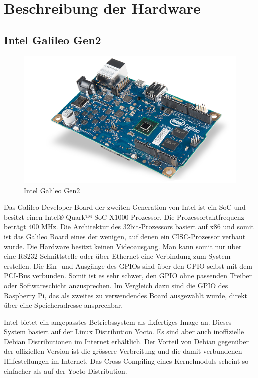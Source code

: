 \pagebreak
\section{Beschreibung der Hardware}
\label{beschreibung_hardware}
\subsection{Intel Galileo Gen2}

\begin{figure}
\centering
\includegraphics[scale=0.5]{images/iot_galileo.png}
\caption{Intel Galileo Gen2\cite{intel_galileo_image}}
\label{fig:Intel Galileo Gen2}
\end{figure}

Das Galileo Developer Board\cite{intel_datasheet_galileo} der zweiten Generation von
Intel ist ein SoC und besitzt einen Intel® Quark™ SoC X1000 Prozessor. Die Prozessortaktfrequenz beträgt 400 MHz. Die Architektur des 32bit-Prozessors basiert auf x86\cite{intel_datasheet} und somit ist das Galileo
Board eines der wenigen, auf denen ein CISC-Prozessor verbaut wurde. Die Hardware
besitzt keinen Videoausgang. Man kann somit nur über eine RS232-Schnittstelle oder über Ethernet
eine Verbindung zum System erstellen. Die Ein- und Ausgänge des GPIOs sind über den GPIO selbst mit dem
PCI-Bus verbunden. Somit ist es sehr schwer, den GPIO ohne passenden Treiber oder
Softwareschicht anzusprechen. Im Vergleich dazu sind die GPIO des Raspberry Pi, das als zweites zu verwendendes Board ausgewählt wurde, direkt über eine Speicheradresse ansprechbar.
\par
Intel bietet ein angepasstes Betriebssystem als fixfertiges Image an. Dieses System basiert auf
der Linux Distribution Yocto. Es sind aber auch inoffizielle Debian Distributionen im
Internet erhältlich. Der Vorteil von Debian gegenüber der offiziellen Version ist die
grössere Verbreitung und die damit verbundenen Hilfestellungen im Internet. Das Cross-Compiling eines Kernelmoduls scheint so einfacher als auf der Yocto-Distribution.


